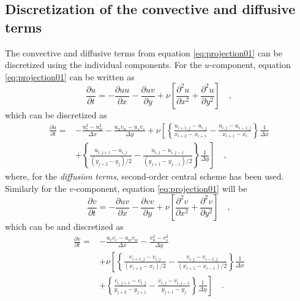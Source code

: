 \documentclass[12pt,a4paper,fleqn]{article}
\begin{document}
\subsection{Discretization of the convective and diffusive terms}
The convective and diffusive terms from equation \eqref{eq:projection01} can be discretized using the individual components. For the $u$-component, equation \eqref{eq:projection01} can be written as
\begin{equation} \label{eq:convective-diffusive-u}
\frac{\partial u}{\partial t} = -\frac{\partial uu}{\partial x} -\frac{\partial uv}{\partial y} + \nu\left[\frac{\partial^2u}{\partial x^2} + \frac{\partial^2u}{\partial y^2}\right] \quad,
\end{equation}
which can be discretized as
\begin{align}\label{eq:discretized_convective-diffusive-u}
\frac{\partial u}{\partial t} =
{}& - \frac{u_e^2 - u_w^2}{\Delta x} - \frac{u_n v_n - u_s v_s}{\Delta y} + \nu\left[
\left\{
\frac{u_{i+1,j}-u_{i,j}}{x_{i+2}-x_{i+1}}
- \frac{u_{i,j}-u_{i-1,j}}{x_{i+1}-x_i}
\right\}
\frac{1}{\Delta x}
\right.\nonumber\\
& \left. + \left\{
\frac{u_{i,j+1}-u_{i,j}}{(y_{j+2}-y_j)/2}
- \frac{u_{i,j}-u_{i,j-1}}{(y_{j+1}-y_{j-1})/2}
\right\}
\frac{1}{\Delta y}
\right] \quad ,
\end{align}
where, for the \emph{diffusion terms}, second-order central scheme has been used. Similarly for the $v$-component, equation \eqref{eq:projection01} will be
\begin{equation} \label{eq:convective-diffusive-v}
\frac{\partial v}{\partial t} = -\frac{\partial uv}{\partial x} -\frac{\partial vv}{\partial y} + \nu\left[\frac{\partial^2v}{\partial x^2} + \frac{\partial^2v}{\partial y^2}\right] \quad ,
\end{equation}
which can be and discretized as
\begin{align}\label{eq:discretized_convective-diffusive-v}
\frac{\partial v}{\partial t} =
{}& - \frac{u_e v_e - u_w v_w}{\Delta x} - \frac{v_n^2 - v_s^2}{\Delta y} \nonumber\\
& + \nu\left[
\left\{
\frac{v_{i+1,j}-v_{i,j}}{(x_{i+2}-x_i)/2}
- \frac{v_{i,j}-v_{i-1,j}}{(x_{i+1}-x_{i-1})/2}
\right\}
\frac{1}{\Delta x}
\right.\nonumber\\
& \left. + \left\{
\frac{v_{i,j+1}-v_{i,j}}{y_{j+2}-y_{j+1}}
- \frac{v_{i,j}-v_{i,j-1}}{y_{j+1}-y_{j}}
\right\}
\frac{1}{\Delta y}
\right] \quad .
\end{align}
\end{document}
